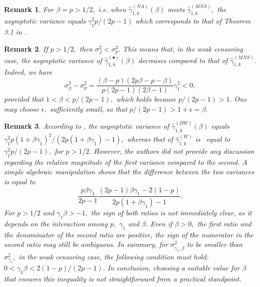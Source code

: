 \documentclass[reqno,openbib,runningheads,a4paper,12pt]{amsart}%
\newtheorem{remark}{Remark}[section]
\begin{document}
\begin{remark}
For $\beta=p>1/2,$ i.e. when $\widehat{\gamma}_{1,k}^{\left(  NA\right)
}\left(  \beta\right)  $ meets $\widehat{\gamma}_{1,k}^{\left(  MNS\right)
},$ the asymptotic variance equals $\gamma_{1}^{2}p/\left(  2p-1\right)  $
which corresponds to that of Theorem 3.1 in \citep[] []{MNS2025}.
\end{remark}

\begin{remark}
If $p>1/2,$ then $\sigma_{\beta}^{2}<\sigma_{p}^{2}.$ This means that, in the
weak censoring case, the asymptotic variance of $\widehat{\gamma}%
_{1,k}^{\left(  \bullet\right)  }\left(  \beta\right)  $ decreases compared to
that of $\widehat{\gamma}_{1,k}^{\left(  MNS\right)  }.$ Indeed, we have%
\[
\sigma_{\beta}^{2}-\sigma_{p}^{2}=\frac{\left(  \beta-p\right)  \left(
2p\beta-p-\beta\right)  }{p\left(  2p-1\right)  \left(  2\beta-1\right)
}\gamma_{1}^{2}<0,
\]
provided that $1<\beta<p/\left(  2p-1\right)  ,$ which holds because
$p/\left(  2p-1\right)  >1.$ One may choose $\epsilon,$ sufficiently small, so
that $p/\left(  2p-1\right)  >1+\epsilon=\beta.$
\end{remark}

\begin{remark}
According to \cite{BWW2019}, the asymptotic variance of $\widehat{\gamma
}_{1,k}^{\left(  BW\right)  }\left(  \beta\right)  $ equals $\gamma_{1}%
^{2}p\left(  1+\beta\gamma_{1}\right)  ^{2}/\left(  2p\left(  1+\beta
\gamma_{1}\right)  -1\right)  ,$ whereas that of $\widehat{\gamma}%
_{1,k}^{\left(  W\right)  }$ is \ equal to $\gamma_{1}^{2}p/\left(
2p-1\right)  ,$ for $p>1/2.$ However, the authors did not provide any
discussion regarding the relative magnitude of the first variance compared to
the second. A simple algebraic manipulation shows that the difference between
the two variances is equal to%
\[
\frac{p\beta\gamma_{1}}{2p-1}\frac{\left(  2p-1\right)  \beta\gamma
_{1}-2\left(  1-p\right)  }{2p\left(  1+\beta\gamma_{1}\right)  -1}.
\]
For $p>1/2$ and $\gamma_{1}\beta>-1,$ the sign of both ratios is not
immediately clear, as it depends on the interaction among $p,$ $\gamma_{1}$
and $\beta.$ Even if $\beta>0,$ the first ratio and the denominator of the
second ratio are positive, the sign of the numerator in the second ratio may
still be ambiguous. In summary, for $\sigma_{\gamma_{1},\beta}^{2}$ to be
smaller than $\sigma_{\gamma_{1}}^{2},$ in the weak censoring case, the
following condition must hold: $0<\gamma_{1}\beta<2\left(  1-p\right)
/\left(  2p-1\right)  .$ In conclusion, choosing a suitable value for $\beta$
that ensures this inequality is not straightforward from a practical standpoint.
\end{remark}
\end{document}
